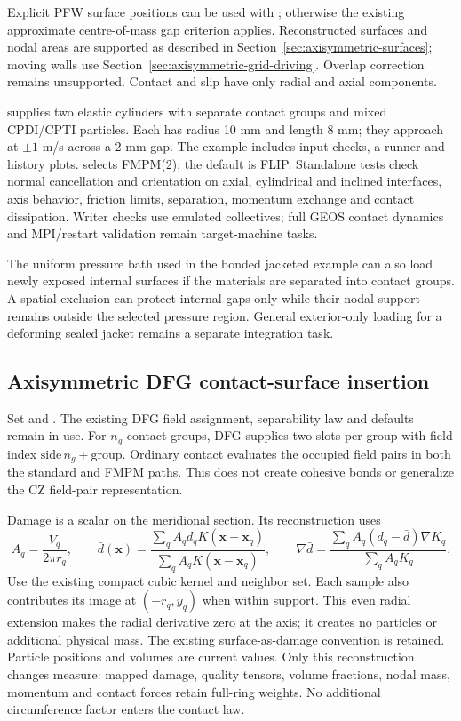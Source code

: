 Explicit PFW surface positions can be used with
; otherwise the existing approximate
centre-of-mass gap criterion applies. Reconstructed surfaces and nodal areas
are supported as described in Section~\ref{sec:axisymmetric-surfaces}; moving
walls use Section~\ref{sec:axisymmetric-grid-driving}. Overlap correction remains
unsupported. Contact and slip have only radial and axial components.

 supplies two elastic cylinders with separate
contact groups and mixed CPDI/CPTI particles. Each has radius 10 mm and length
8 mm; they approach at $\pm1$ m/s across a 2-mm gap. The example includes input
checks, a runner and history plots.  selects
FMPM(2); the default is FLIP. Standalone tests check normal cancellation and
orientation on axial, cylindrical and inclined interfaces, axis behavior,
friction limits, separation, momentum exchange and contact dissipation. Writer
checks use emulated collectives; full GEOS contact dynamics and MPI/restart
validation remain target-machine tasks.

The uniform pressure bath used in the bonded jacketed example can also load
newly exposed internal surfaces if the materials are separated into contact
groups. A spatial exclusion can protect internal gaps only while their nodal
support remains outside the selected pressure region. General exterior-only
loading for a deforming sealed jacket remains a separate integration task.


\subsection{Axisymmetric DFG contact-surface insertion}
Set  and .
The existing DFG field assignment, separability law and defaults remain in
use. For $n_g$ contact groups, DFG supplies two slots per group with field
index $\mathrm{side}\,n_g+\mathrm{group}$. Ordinary contact evaluates the
occupied field pairs in both the standard and FMPM paths. This does not
create cohesive bonds or generalize the CZ field-pair representation.

Damage is a scalar on the meridional section. Its reconstruction uses
\[
 A_q=\frac{V_q}{2\pi r_q},\qquad
 \bar d(\boldsymbol x)=\frac{\sum_q A_q d_q K(\boldsymbol x-\boldsymbol x_q)}
                              {\sum_q A_q K(\boldsymbol x-\boldsymbol x_q)},\qquad
 \nabla\bar d=\frac{\sum_q A_q(d_q-\bar d)\nabla K_q}{\sum_q A_q K_q}.
\]
Use the existing compact cubic kernel and neighbor set. Each sample also
contributes its image at $(-r_q,y_q)$ when within support. This even radial
extension makes the radial derivative zero at the axis; it creates no
particles or additional physical mass. The existing surface-as-damage
convention is retained. Particle positions and volumes are current values.
Only this reconstruction changes measure: mapped damage, quality tensors,
volume fractions, nodal mass, momentum and contact forces retain full-ring
weights. No additional circumference factor enters the contact law.

